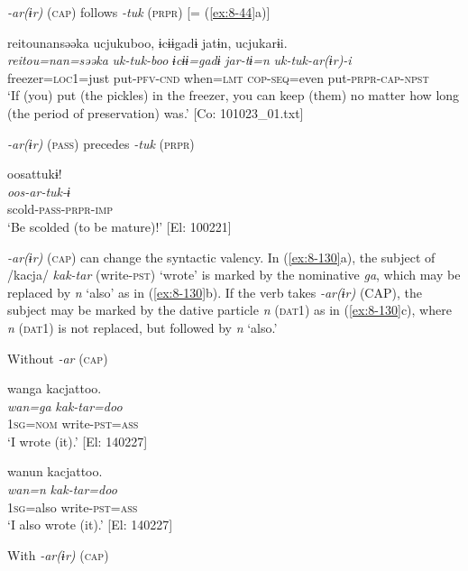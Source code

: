 \ea\label{ex:8-129}
\ea \textit{-ar(ɨr)} (\textsc{cap}) follows \textit{-tuk} (\textsc{prpr}) [= (\ref{ex:8-44}a)]

  {\TM}
\glll  {\textbar}reitou{\textbar}nansəəka  ucjukuboo,  ɨcɨɨgadɨ  jatɨn,    ucjukarɨi.\\
\textit{reitou=nan=səəka}  \textit{uk-tuk-boo}  \textit{ɨcɨɨ=gadɨ}  \textit{jar-tɨ=n}    \textit{uk-tuk-ar(ɨr)-i}\\
    freezer=\textsc{loc}1=just  put-\textsc{pfv}-\textsc{cnd}  when=\textsc{lmt}  \textsc{cop}-\textsc{seq}=even put-\textsc{prpr}-\textsc{cap}-\textsc{npst}\\
\glt ‘If (you) put (the pickles) in the freezer, you can keep (them) no matter how long (the period of preservation) was.’ [Co: 101023\_01.txt]


\ex \textit{-ar(ɨr)} (\textsc{pass}) precedes \textit{-tuk} (\textsc{prpr})

  {\TM}
\glll  oosattukɨ!\\
\textit{oos-ar-tuk-ɨ}\\
  scold-\textsc{pass}-\textsc{prpr}-\textsc{imp}\\
\glt ‘Be scolded (to be mature)!’ [El: 100221]
\z
\z

  \textit{-ar(ɨr)} (\textsc{cap}) can change the syntactic valency. In (\ref{ex:8-130}a), the subject of /kacja/ \textit{kak-tar} (write-\textsc{pst}) ‘wrote’ is marked by the nominative \textit{ga}, which may be replaced by \textit{n} ‘also’ as in (\ref{ex:8-130}b). If the verb takes \textit{-ar(ɨr)} (CAP), the subject may be marked by the dative particle \textit{n} (\textsc{dat1}) as in (\ref{ex:8-130}c), where \textit{n} (\textsc{dat1}) is not replaced, but followed by \textit{n} ‘also.’

\ea\label{ex:8-130}
  Without \textit{-ar} (\textsc{cap})

\ea
{\TM}
\glll  wanga  kacjattoo.\\
\textit{wan=ga}  \textit{kak-tar=doo}\\
1\textsc{sg}=\textsc{nom}  write-\textsc{pst}=\textsc{ass}\\
\glt ‘I wrote (it).’ [El: 140227]

\ex
{\TM}
\glll  wanun  kacjattoo.\\
\textit{wan=n}  \textit{kak-tar=doo}\\
1\textsc{sg}=also  write-\textsc{pst}=\textsc{ass}\\
\glt ‘I also wrote (it).’ [El: 140227]

  With \textit{-ar(ɨr)} (\textsc{cap})

